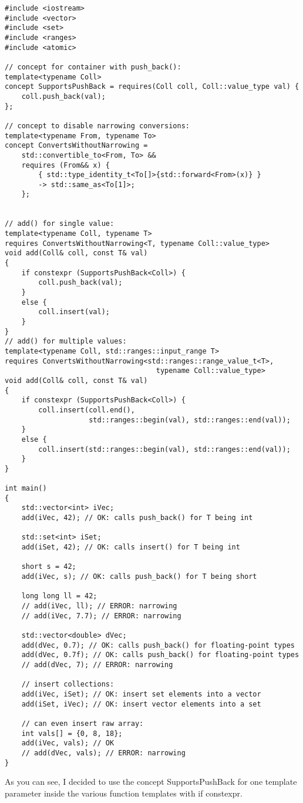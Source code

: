 \begin{lstlisting}[style=styleCXX]
#include <iostream>
#include <vector>
#include <set>
#include <ranges>
#include <atomic>

// concept for container with push_back():
template<typename Coll>
concept SupportsPushBack = requires(Coll coll, Coll::value_type val) {
	coll.push_back(val);
};

// concept to disable narrowing conversions:
template<typename From, typename To>
concept ConvertsWithoutNarrowing =
	std::convertible_to<From, To> &&
	requires (From&& x) {
		{ std::type_identity_t<To[]>{std::forward<From>(x)} }
		-> std::same_as<To[1]>;
	};


// add() for single value:
template<typename Coll, typename T>
requires ConvertsWithoutNarrowing<T, typename Coll::value_type>
void add(Coll& coll, const T& val)
{
	if constexpr (SupportsPushBack<Coll>) {
		coll.push_back(val);
	}
	else {
		coll.insert(val);
	}
}
// add() for multiple values:
template<typename Coll, std::ranges::input_range T>
requires ConvertsWithoutNarrowing<std::ranges::range_value_t<T>,
									typename Coll::value_type>
void add(Coll& coll, const T& val)
{
	if constexpr (SupportsPushBack<Coll>) {
		coll.insert(coll.end(),
					std::ranges::begin(val), std::ranges::end(val));
	}
	else {
		coll.insert(std::ranges::begin(val), std::ranges::end(val));
	}
}

int main()
{
	std::vector<int> iVec;
	add(iVec, 42); // OK: calls push_back() for T being int
	
	std::set<int> iSet;
	add(iSet, 42); // OK: calls insert() for T being int
	
	short s = 42;
	add(iVec, s); // OK: calls push_back() for T being short
	
	long long ll = 42;
	// add(iVec, ll); // ERROR: narrowing
	// add(iVec, 7.7); // ERROR: narrowing
	
	std::vector<double> dVec;
	add(dVec, 0.7); // OK: calls push_back() for floating-point types
	add(dVec, 0.7f); // OK: calls push_back() for floating-point types
	// add(dVec, 7); // ERROR: narrowing
	
	// insert collections:
	add(iVec, iSet); // OK: insert set elements into a vector
	add(iSet, iVec); // OK: insert vector elements into a set
	
	// can even insert raw array:
	int vals[] = {0, 8, 18};
	add(iVec, vals); // OK
	// add(dVec, vals); // ERROR: narrowing
}
\end{lstlisting}

As you can see, I decided to use the concept SupportsPushBack for one template parameter inside the various function templates with if constexpr.

